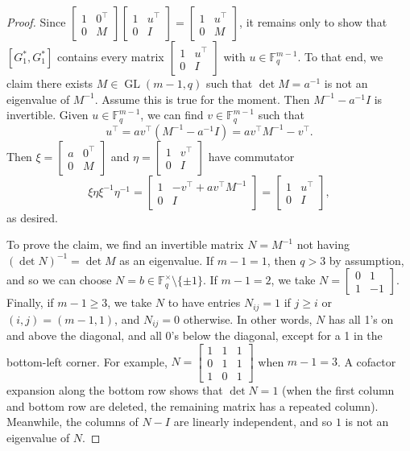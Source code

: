 \documentclass[11pt]{article}
\theoremstyle{definition}
\numberwithin{equation}{section}
\begin{document}
\begin{proof}
Since $\begin{bmatrix} 1 & 0^\top \\ 0 & M \end{bmatrix} \begin{bmatrix} 1 & u^\top \\ 0 & I \end{bmatrix} = \begin{bmatrix} 1 & u^\top \\ 0 & M \end{bmatrix}$, it remains only to show that $[G_1^*,G_1^*]$ contains every matrix $\begin{bmatrix} 1 & u^\top \\ 0 & I \end{bmatrix}$ with $u \in \mathbb{F}_q^{m-1}$.
To that end, we claim there exists $M \in \operatorname{GL}(m-1,q)$ such that $\det M = a^{-1}$ is not an eigenvalue of $M^{-1}$.
Assume this is true for the moment.
Then $M^{-1} - a^{-1} I$ is invertible.
Given $u \in \mathbb{F}_q^{m-1}$, we can find $v \in \mathbb{F}_q^{m-1}$ such that 
\[ u^\top = av^\top(M^{-1} - a^{-1} I) = av^\top M^{-1} - v^\top. \]
Then $\xi = \begin{bmatrix} a & 0^\top \\ 0  & M \end{bmatrix}$ and $\eta = \begin{bmatrix} 1 & v^\top \\ 0 & I \end{bmatrix}$ have commutator 
\[ \xi \eta \xi^{-1} \eta^{-1} = \begin{bmatrix} 1 & -v^\top + av^\top M^{-1} \\ 0 & I \end{bmatrix} = \begin{bmatrix} 1 & u^\top \\ 0 & I \end{bmatrix}, \]
as desired.

To prove the claim, we find an invertible matrix $N = M^{-1}$ not having $(\det N)^{-1} = \det M$ as an eigenvalue.
If $m-1 = 1$, then $q > 3$ by assumption, and so we can choose $N = b \in \mathbb{F}_q^\times \setminus \{ \pm 1\}$.
If $m-1 = 2$, we take $N = \begin{bmatrix} 0 & 1 \\ 1 & -1 \end{bmatrix}$.
Finally, if $m-1 \geq 3$, we take $N$ to have entries $N_{ij} = 1$ if $j \geq i$ or $(i,j) = (m-1,1)$, and $N_{ij} = 0$ otherwise.
In other words, $N$ has all 1's on and above the diagonal, and all 0's below the diagonal, except for a 1 in the bottom-left corner.
For example, $N = \begin{bmatrix} 1 & 1 & 1 \\ 0 & 1 & 1 \\ 1 & 0 & 1 \end{bmatrix}$ when $m-1=3$.
A cofactor expansion along the bottom row shows that $\det N = 1$ (when the first column and bottom row are deleted, the remaining matrix has a repeated column).
Meanwhile, the columns of $N-I$ are linearly independent, and so $1$ is not an eigenvalue of $N$.
\end{proof}
\end{document}
